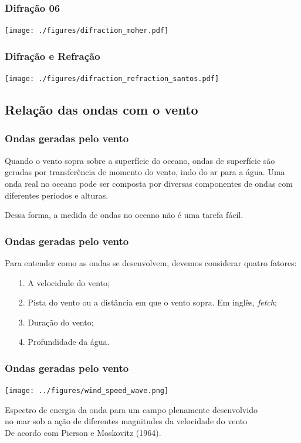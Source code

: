 \begin{frame}
\frametitle{Difração 06}
\begin{center}
  \texttt{[image: ./figures/difraction\_moher.pdf]}
\end{center}
\end{frame}


\begin{frame}
\frametitle{Difração e Refração}
\begin{center}
  \texttt{[image: ./figures/difraction\_refraction\_santos.pdf]}
\end{center}
\end{frame}


\subsection{Relação das ondas com o vento}
\begin{frame}
\frametitle{Ondas geradas pelo vento}
  \begin{block}{}
    Quando o vento sopra sobre a superfície do oceano, ondas de superfície são
    geradas por transferência de momento do vento, indo do ar para a água.
    Uma onda real no oceano pode ser composta por diversas componentes de ondas
    com diferentes períodos e alturas.

    Dessa forma, a medida de ondas no oceano não é uma tarefa fácil.
  \end{block}
\end{frame}

\begin{frame}
\frametitle{Ondas geradas pelo vento}
  Para entender como as ondas se desenvolvem, devemos considerar quatro
  fatores:
  \begin{itemize}[<+-| alert@+>]
    \item[1.] A velocidade do vento;
    \item[2.] Pista do vento ou a distância em que o vento sopra.  Em inglês,
              {\it fetch};
    \item[3.] Duração do vento;
    \item[4.] Profundidade da água.
  \end{itemize}
\end{frame}


\begin{frame}
\frametitle{Ondas geradas pelo vento}
  \begin{center}
    \texttt{[image: ../figures/wind\_speed\_wave.png]}
  \end{center}
  \tiny{Espectro de energia da onda para um campo plenamente desenvolvido\\
        no mar sob a ação de diferentes magnitudes da velocidade do vento\\
        De acordo com Pierson e Moskovitz (1964).}
\end{frame}


